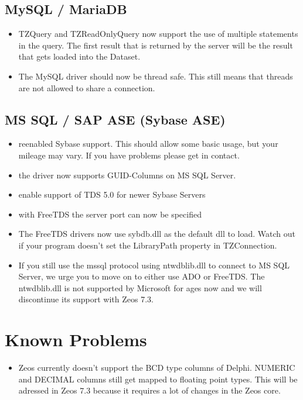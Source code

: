 \documentclass[a4paper,12pt,oneside]{article}
\begin{document}
\subsection{MySQL / MariaDB}
\begin{itemize}
\item
  TZQuery and TZReadOnlyQuery now support the use of multiple statements in the query.
	The first result that is returned by the server will be the result that gets loaded into the Dataset.
\item
  The MySQL driver should now be thread safe.
	This still means that threads are not allowed to share a connection.
\end{itemize}

\subsection{MS SQL / SAP ASE (Sybase ASE)}
\begin{itemize}
\item 
  reenabled Sybase support.
	This should allow some basic usage, but your mileage may vary.
	If you have problems please get in contact.
\item the driver now supports GUID-Columns on MS SQL Server.
\item enable support of TDS 5.0 for newer Sybase Servers
\item with FreeTDS the server port can now be specified
\item 
  The FreeTDS drivers now use sybdb.dll as the default dll to load.
	Watch out if your program doesn't set the LibraryPath property in TZConnection.
\item 
  If you still use the mssql protocol using ntwdblib.dll to connect to MS SQL Server, we urge you to move on to either use ADO or FreeTDS.
	The ntwdblib.dll is not supported by Microsoft for ages now and we will discontinue its support with Zeos 7.3.
\end{itemize}

\section{Known Problems}
\begin{itemize}
\item 
  Zeos currently doesn't support the BCD type columns of Delphi.
	NUMERIC and DECIMAL columns still get mapped to floating point types.
	This will be adressed in Zeos 7.3 because it requires a lot of changes in the Zeos core.
\end{itemize}
\end{document}
